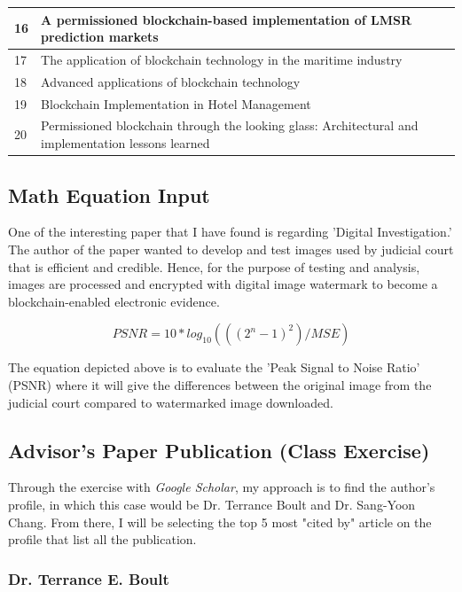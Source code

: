 \documentclass[11pt]{article}
\begin{document}
\begin{center}
\begin{tabular}{ | m{.5cm} | m{10cm}| m{1cm} | }
  \hline
  16 & A permissioned blockchain-based implementation of LMSR prediction markets & \cite{carvalho2020permissioned} \\ 
  \hline
  17 & The application of blockchain technology in the maritime industry & \cite{czachorowski2019application} \\ 
  \hline
  18 & Advanced applications of blockchain technology & \cite{kim2020advanced} \\  
  \hline
  19 & Blockchain Implementation in Hotel Management  & \cite{flecha2020blockchain} \\ 
  \hline
  20 & Permissioned blockchain through the looking glass: Architectural and implementation lessons learned & \cite{gupta2020permissioned} \\  
  \hline
\end{tabular}
\end{center}

\subsection{Math Equation Input}

One of the interesting paper that I have found is regarding 'Digital Investigation.' The author of the paper wanted to develop and test images used by judicial court that is efficient and credible. Hence, for the purpose of testing and analysis, images are processed and encrypted with digital image watermark to become a blockchain-enabled electronic evidence.

\[PSNR = 10 * log_{10} (((2^n-1)^2)/MSE)\]

The equation depicted above is to evaluate the 'Peak Signal to Noise Ratio' (PSNR) where it will give the differences between the original image from the judicial court compared to watermarked image downloaded. \cite{chen2020study}

\subsection{Advisor's Paper Publication (Class Exercise)}

Through the exercise with \emph{Google Scholar}, my approach is to find the author's profile, in which this case would be Dr. Terrance Boult and Dr. Sang-Yoon Chang. From there, I will be selecting the top 5 most "cited by" article on the profile that list all the publication.

\subsubsection{Dr. Terrance E. Boult}
\end{document}
